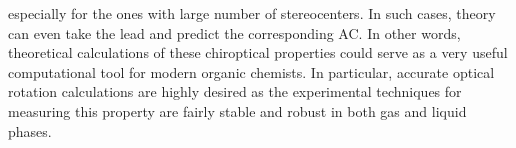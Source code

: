 especially for the ones with large number of stereocenters. In such cases, theory can even take the 
lead and predict the corresponding AC. In other words, theoretical calculations of these chiroptical 
properties could serve as a very useful computational tool for modern organic chemists. In particular, 
accurate optical rotation calculations are highly desired as the experimental techniques for measuring 
this property are fairly stable and robust in both gas and liquid phases.
\\
